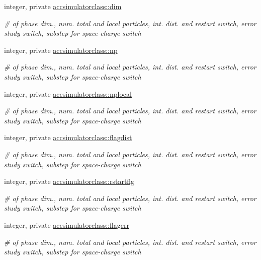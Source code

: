 \textbf{ }\par
\begin{DoxyCompactItemize}
\item 
integer, private \mbox{\hyperlink{namespaceaccsimulatorclass_a26217a3bed78a53045dc70c1ac59207a}{accsimulatorclass\+::dim}}
\begin{DoxyCompactList}\small\item\em \# of phase dim., num. total and local particles, int. dist. and restart switch, error study switch, substep for space-\/charge switch \end{DoxyCompactList}\item 
integer, private \mbox{\hyperlink{namespaceaccsimulatorclass_a1149425f2a1942ae90449ee7a0a06fe0}{accsimulatorclass\+::np}}
\begin{DoxyCompactList}\small\item\em \# of phase dim., num. total and local particles, int. dist. and restart switch, error study switch, substep for space-\/charge switch \end{DoxyCompactList}\item 
integer, private \mbox{\hyperlink{namespaceaccsimulatorclass_a673e05862dc992db1e5f59ae966a1bc6}{accsimulatorclass\+::nplocal}}
\begin{DoxyCompactList}\small\item\em \# of phase dim., num. total and local particles, int. dist. and restart switch, error study switch, substep for space-\/charge switch \end{DoxyCompactList}\item 
integer, private \mbox{\hyperlink{namespaceaccsimulatorclass_a487e5f5861f9d6613a37837a38e8a2c0}{accsimulatorclass\+::flagdist}}
\begin{DoxyCompactList}\small\item\em \# of phase dim., num. total and local particles, int. dist. and restart switch, error study switch, substep for space-\/charge switch \end{DoxyCompactList}\item 
integer, private \mbox{\hyperlink{namespaceaccsimulatorclass_af704d398708fe866be2cd6b2f2705267}{accsimulatorclass\+::rstartflg}}
\begin{DoxyCompactList}\small\item\em \# of phase dim., num. total and local particles, int. dist. and restart switch, error study switch, substep for space-\/charge switch \end{DoxyCompactList}\item 
integer, private \mbox{\hyperlink{namespaceaccsimulatorclass_aeed14cf632798f53deb7a49d73f7d09f}{accsimulatorclass\+::flagerr}}
\begin{DoxyCompactList}\small\item\em \# of phase dim., num. total and local particles, int. dist. and restart switch, error study switch, substep for space-\/charge switch \end{DoxyCompactList}\end{DoxyCompactItemize}

